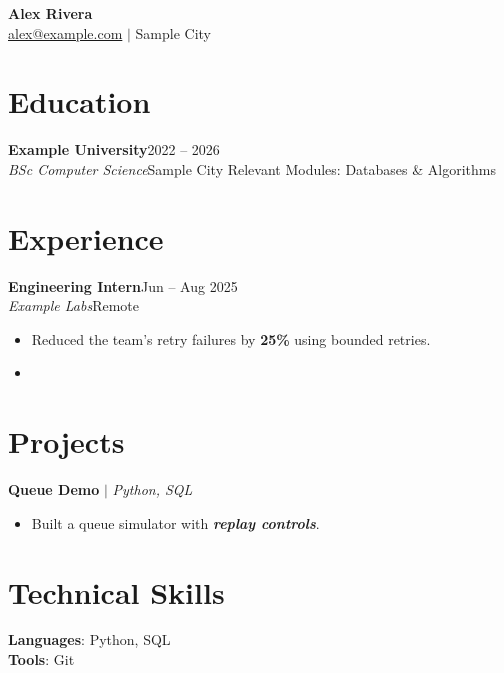 \documentclass{article}
\newcommand{\resumeSubheading}[4]{\textbf{#1}\hfill#2\\\textit{#3}\hfill#4}
\newcommand{\resumeProjectHeading}[2]{#1\hfill#2}
\newcommand{\resumeItem}[1]{\item #1}
\newcommand{\resumeLine}[1]{#1}
\newcommand{\resumeItemListStart}{\begin{itemize}}
\newcommand{\resumeItemListEnd}{\end{itemize}}
\begin{document}
\begin{center}
\textbf{Alex Rivera}\\
\href{mailto:alex@example.com}{alex@example.com} $|$ Sample City
\end{center}
\section{Education}
\resumeSubheading{Example University}{2022 -- 2026}{BSc Computer Science}{Sample City}
\resumeLine{Relevant Modules: Databases \& Algorithms}
\section{Experience}
\resumeSubheading{Engineering Intern}{Jun -- Aug 2025}{Example Labs}{Remote}
\resumeItemListStart
\resumeItem{Reduced the team’s retry failures by \textbf{25\%}
using bounded retries.}
\resumeItem{}
\resumeItemListEnd
\section{Projects}
\resumeProjectHeading{\textbf{Queue Demo} $|$ \emph{Python, SQL}}{}
\resumeItemListStart
\resumeItem{Built a queue simulator with \textbf{\emph{replay controls}}.}
\resumeItemListEnd
\section{Technical Skills}
\textbf{Languages}: Python, SQL\\
\textbf{Tools}: Git
\end{document}
